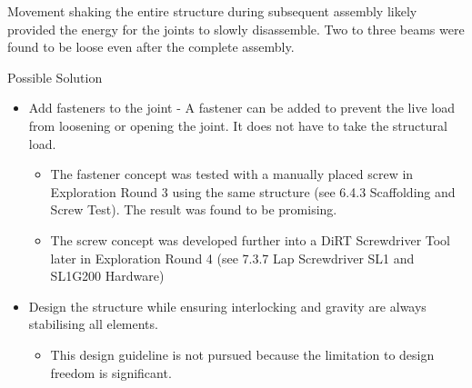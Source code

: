 Movement shaking the entire structure during subsequent assembly likely provided the energy for the joints to slowly disassemble. Two to three beams were found to be loose even after the complete assembly. 

Possible Solution
\begin{itemize}
    \item Add fasteners to the joint - A fastener can be added to prevent the live load from loosening or opening the joint. It does not have to take the structural load.
    \begin{itemize}
        \item The fastener concept was tested with a manually placed screw in Exploration Round 3 using the same structure (see 6.4.3 Scaffolding and Screw Test). The result was found to be promising.
        \item The screw concept was developed further into a DiRT Screwdriver Tool later in Exploration Round 4 (see 7.3.7 Lap Screwdriver SL1 and SL1\textunderscore G200 Hardware)
    \end{itemize}
    \item Design the structure while ensuring interlocking and gravity are always stabilising all elements. 
    \begin{itemize}
        \item This design guideline is not pursued because the limitation to design freedom is significant. 
    \end{itemize}
\end{itemize}
